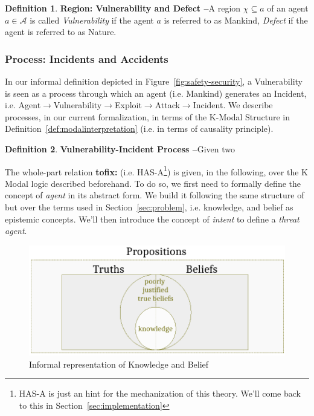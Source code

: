 \documentclass{article}
\newcommand{\fix}[2]{{\color{red} {\bf tofix:} #2}}
\theoremstyle{definition}
\newtheorem{definition}{Definition}[section]
\theoremstyle{corollary}
\theoremstyle{lemma}
\theoremstyle{theorem}
\theoremstyle{theorem}
\newcommand{\region}{\chi}
\newcommand{\agentuniverse}{\mathcal{A}}
\newcommand{\agent}{a}
\begin{document}
\begin{definition}{\bf Region: Vulnerability and Defect --}\label{def:vulnerability-defect}
A region $\region\subseteq\agent$ of an agent $\agent\in\agentuniverse$ is
	called \emph{Vulnerability} if the agent $\agent$ is referred to as Mankind, 
	\emph{Defect} if the agent is referred to as Nature.
\end{definition}

\subsubsection{Process: Incidents and Accidents}\label{sec:vulnerabilitydefect}
In our informal definition depicted in Figure~\ref{fig:safety-security}, a
Vulnerability is seen as a process through which an agent (i.e. Mankind)
generates an Incident, i.e.
Agent$\rightarrow$Vulnerability$\rightarrow$Exploit$\rightarrow$Attack$\rightarrow$Incident.
We describe processes, in our current formalization, in terms of the K-Modal
Structure in Definition~\ref{def:modalinterpretation} (i.e. in terms of
causality principle). 


\begin{definition}{\bf Vulnerability-Incident Process --}\label{def:vulnerability-incident}
	Given two 
\end{definition}

The whole-part relation \fix{mr}{(i.e.  HAS-A\footnote{HAS-A is just an hint for the
mechanization of this theory.  We'll come back to this in
Section~\ref{sec:implementation}})} is given, in the following, over the K Modal
logic described beforehand. To do so, we first need to formally define the
concept of \emph{agent} in its abstract form. We build it following the same
structure of\autocite{Santaca2016abf} but over the terms used in
Section~\ref{sec:problem}, i.e. knowledge, and belief as epistemic concepts. We'll then 
introduce the concept of \emph{intent} to define a \emph{threat agent}.

\begin{figure}[t]
	\centering
	\includegraphics[width=.8\textwidth]{knowledge-belief.pdf}
	\caption{Informal representation of Knowledge and Belief}
	\label{fig:knowledge-belief}
\end{figure}
\end{document}
